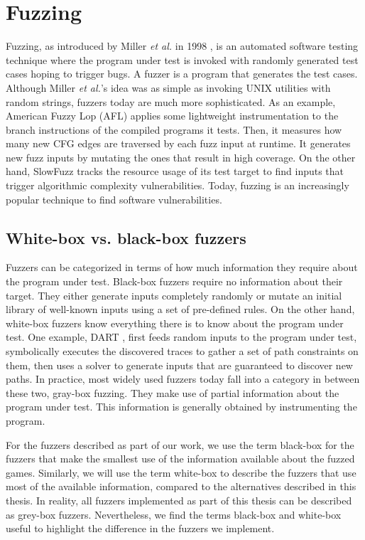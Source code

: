 \section{Fuzzing}
Fuzzing, as introduced by Miller \textit{et al.} in 1998 \cite{Miller1999}, is an automated software testing technique where the program under test is invoked with randomly generated test cases hoping to trigger bugs.
A fuzzer is a program that generates the test cases. Although Miller \textit{et al.}'s idea was as simple as invoking UNIX utilities with random strings, fuzzers today are much more sophisticated.
As an example, American Fuzzy Lop (AFL) \cite{AFL} applies some lightweight instrumentation to the branch instructions of the compiled programs it tests.
Then, it measures how many new CFG edges are traversed by each fuzz input at runtime.
It generates new fuzz inputs by mutating the ones that result in high coverage.
On the other hand, SlowFuzz \cite{Slowfuzz} tracks the resource usage of its test target to find inputs that trigger algorithmic complexity vulnerabilities.
Today, fuzzing is an increasingly popular technique to find software vulnerabilities.

\subsection{White-box vs. black-box fuzzers}
Fuzzers can be categorized in terms of how much information they require about the program under test.
Black-box fuzzers require no information about their target.
They either generate inputs completely randomly or mutate an initial library of well-known inputs using a set of pre-defined rules.
On the other hand, white-box fuzzers know everything there is to know about the program under test.
One example, DART \cite{Dart}, first feeds random inputs to the program under test, symbolically executes the discovered traces to gather a set of path constraints on them, then uses a solver to generate inputs that are guaranteed to discover new paths.
In practice, most widely used fuzzers today fall into a category in between these two, gray-box fuzzing.
They make use of partial information about the program under test.
This information is generally obtained by instrumenting the program.

For the fuzzers described as part of our work, we use the term black-box for the fuzzers that make the smallest use of the information available about the fuzzed games.
Similarly, we will use the term white-box to describe the fuzzers that use most of the available information, compared to the alternatives described in this thesis.
In reality, all fuzzers implemented as part of this thesis can be described as grey-box fuzzers.
Nevertheless, we find the terms black-box and white-box useful to highlight the difference in the fuzzers we implement.

